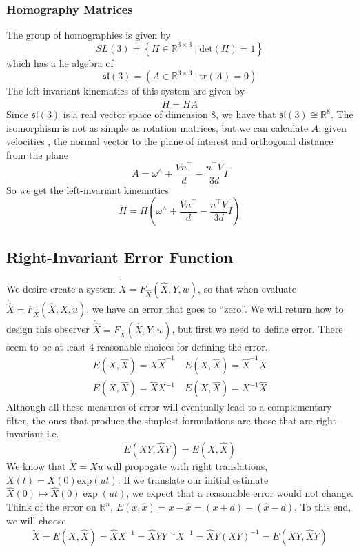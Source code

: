\documentclass[a4paper]{article}
\begin{document}
\subsubsection*{Homography Matrices}%
The group of homographies is given by
\[
  SL(3) = \left\{ H \in \mathds{R}^{3 \times 3} \ |\  \text{det}(H) = 1 \right\}
\]
which has a lie algebra of
\[
  \mathfrak{sl}(3) = \left( A \in \mathds{R}^{3 \times 3} \ |\ \text{tr}(A) = 0\right)
\]
The left-invariant kinematics of this system are given by
\[
  \dot{H} = HA
\]
Since $\mathfrak{sl}(3)$ is a real vector space of dimension 8, we have that $\mathfrak{sl}(3) \cong \mathds{R}^8$. The isomorphism is not as simple as rotation matrices, but we can calculate $A$, given velocities , the normal vector to the plane of interest and orthogonal distance from the plane
\[
  A =  \omega^{\wedge} + \frac{Vn^{\top}}{d} - \frac{n^\top V}{3d} I
\]
So we get the left-invariant kinematics
\[
  \dot{H} = H\left(\omega^{\wedge} + \frac{Vn^{\top}}{d} - \frac{n^\top V}{3d}I \right)
\]

\subsection*{Right-Invariant Error Function}%
We desire create a system $\dot{\hat{X}} = F_{\hat{X}}(\hat{X}, Y, w)$, so that when evaluate $\dot{\hat{X}} = F_{\hat{X}}(\hat{X}, X, u)$, we have an error that goes to ``zero''. We will return how to design this observer $\dot{\hat{X}} = F_{\hat{X}}(\hat{X}, Y,w)$, but first we need to define error. There seem to be at least 4 reasonable choices for defining the error.
\[
  \begin{aligned}
    E(X,\hat{X}) = X\hat{X}^{-1} \quad E(X, \hat{X}) = \hat{X}^{-1}X \\
    E(X, \hat{X}) = \hat{X}X^{-1} \quad E(X, \hat{X}) = X^{-1}\hat{X}
  \end{aligned}
\]
Although all these measures of error will eventually lead to a complementary filter, the ones that produce the simplest formulations are those that are right-invariant i.e.
\[
  E(XY, \hat{X}Y) = E(X, \hat{X})
\]
We know that $\dot{X} = Xu$ will propogate with right translations, $X(t) = X(0) \text{exp}\left( u t \right)$. If we translate our initial estimate $\hat{X}(0) \mapsto \hat{X}(0)\exp(ut)$, we expect that a reasonable error would not change. Think of the error on $\mathds{R}^n$, $E(x,\hat{x}) = x - \hat{x} = (x + d) - (\hat{x} - d)$. To this end, we will choose
\[
  \tilde{X} = E(X, \hat{X}) = \hat{X}X^{-1} = \hat{X}YY^{-1}X^{-1} = \hat{X}Y(XY)^{-1} = E(XY, \hat{X}Y)
\]
\end{document}
